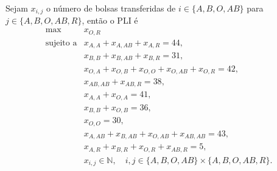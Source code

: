 \documentclass{article}
\newcommand{\N}{\mathbb{N}}
\begin{document}
\begin{enumerate}[resume*=exerc]
\begin{framed}
\begin{center}
    
\end{center}
Sejam $x_{i,j}$ o número de bolsas transferidas de $i\in\{A,B,O,AB\}$ para $j\in\{A,B,O,AB,R\}$, então o PLI é
\[
\begin{array}{rl}
  \max & x_{O,R} \\
  \text{sujeito a} & x_{A,A} + x_{A,AB} + x_{A,R} = 44,\\
  & x_{B,B} + x_{B,AB} + x_{B,R} = 31,\\
  & x_{O,A} + x_{O,B} + x_{O,O} + x_{O,AB} + x_{O,R} = 42,\\
  & x_{AB,AB} + x_{AB,R} = 38,\\
  & x_{A,A} + x_{O,A} = 41,\\
  & x_{B,B} + x_{O,B} = 36,\\
  & x_{O,O} = 30,\\
  & x_{A,AB} + x_{B,AB} + x_{O,AB} + x_{AB,AB} = 43,\\
  & x_{A,R} + x_{B,R} + x_{O,R} + x_{AB,R} = 5,\\
  & x_{i,j} \in \N, \quad i,j\in\{A,B,O,AB\}\times\{A,B,O,AB,R\}.
\end{array}
\]

\end{framed}


\end{enumerate}

\pagebreak
\end{document}
